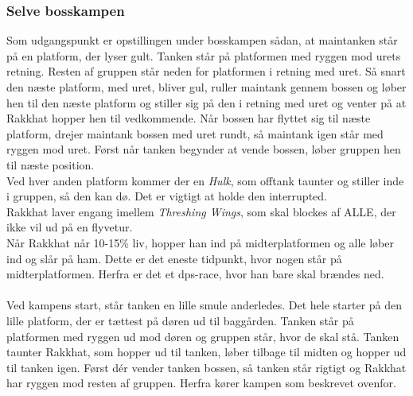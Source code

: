 \subsubsection*{Selve bosskampen}
Som udgangspunkt er opstillingen under bosskampen sådan, at maintanken står på
en platform, der lyser gult. Tanken står på platformen med ryggen mod urets
retning. Resten af gruppen står neden for platformen i retning med uret. Så
snart den næste platform, med uret, bliver gul, ruller maintank gennem bossen
og løber hen til den næste platform og stiller sig på den i retning med uret
og venter på at Rakkhat hopper hen til vedkommende. Når bossen har flyttet sig
til næste platform, drejer maintank bossen med uret rundt, så maintank igen
står med ryggen mod uret. Først når tanken begynder at vende bossen, løber
gruppen hen til næste position. \\
Ved hver anden platform kommer der en
\emph{Hulk}, som offtank taunter og stiller inde i gruppen, så den kan dø. Det
er vigtigt at holde den interrupted.\\
Rakkhat laver engang imellem \emph{Threshing Wings}, som skal blockes af ALLE,
der ikke vil ud på en flyvetur.\\
Når Rakkhat når 10-15\% liv, hopper han ind på midterplatformen og alle løber
ind og slår på ham. Dette er det eneste tidpunkt, hvor nogen står på
midterplatformen. Herfra er det et dps-race, hvor han bare skal brændes ned.\\
\\
Ved kampens start, står tanken en lille smule anderledes. Det hele starter på
den lille platform, der er tættest på døren ud til baggården. Tanken står på
platformen med ryggen ud mod døren og gruppen står, hvor de skal stå. Tanken
taunter Rakkhat, som hopper ud til tanken, løber tilbage til midten og hopper
ud til tanken igen. Først dér vender tanken bossen, så tanken står rigtigt og
Rakkhat har ryggen mod resten af gruppen. Herfra kører kampen som beskrevet
ovenfor.
